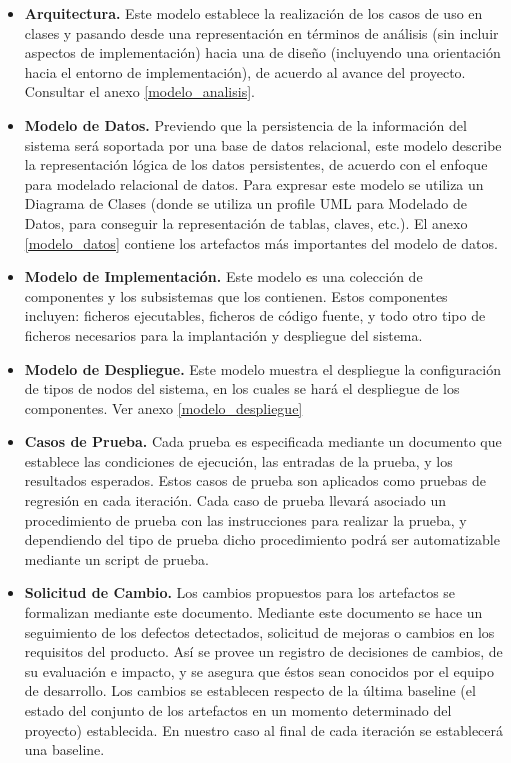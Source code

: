 \begin{itemize}
\item \textbf{Arquitectura.} Este modelo establece la realización de los casos de uso en clases y pasando desde una representación en términos de análisis (sin incluir aspectos de implementación) hacia una de diseño (incluyendo una orientación hacia el entorno de implementación), de acuerdo al avance del proyecto.  Consultar el anexo \ref{modelo_analisis}.

\item \textbf{Modelo de Datos.} Previendo que la persistencia de la información del sistema será soportada por una base de datos relacional, este modelo describe la representación lógica de los datos persistentes, de acuerdo con el enfoque para modelado relacional de datos. Para expresar este modelo se utiliza un Diagrama de Clases (donde se utiliza un profile UML para Modelado de Datos, para conseguir la representación de tablas, claves, etc.). El anexo \ref{modelo_datos} contiene los artefactos más importantes del modelo de datos. 

\item \textbf{Modelo de Implementación.} Este modelo es una colección de componentes y los subsistemas que los contienen. Estos componentes incluyen: ficheros ejecutables, ficheros de código fuente, y todo otro tipo de ficheros necesarios para la implantación y despliegue del sistema.

\item \textbf{Modelo de Despliegue.} Este modelo muestra el despliegue la configuración de tipos de nodos del sistema, en los cuales se hará el despliegue de los componentes. Ver anexo \ref{modelo_despliegue} 

\item \textbf{Casos de Prueba.} Cada prueba es especificada mediante un documento que establece las condiciones de ejecución, las entradas de la prueba, y los resultados esperados. Estos casos de prueba son aplicados como pruebas de regresión en cada iteración. Cada caso de prueba llevará asociado un procedimiento de prueba con las instrucciones para realizar la prueba, y dependiendo del tipo de prueba dicho procedimiento podrá ser automatizable mediante un script de prueba. 

\item \textbf{Solicitud de Cambio.} Los cambios propuestos para los artefactos se formalizan mediante este documento. Mediante este documento se hace un seguimiento de los defectos detectados, solicitud de mejoras o cambios en los requisitos del producto. Así se provee un registro de decisiones de cambios, de su evaluación e impacto, y se asegura que éstos sean conocidos por el equipo de desarrollo. Los cambios se establecen respecto de la última baseline (el estado del conjunto de los artefactos en un momento determinado del proyecto) establecida. En nuestro caso al final de cada iteración se establecerá una baseline. 


\end{itemize}

